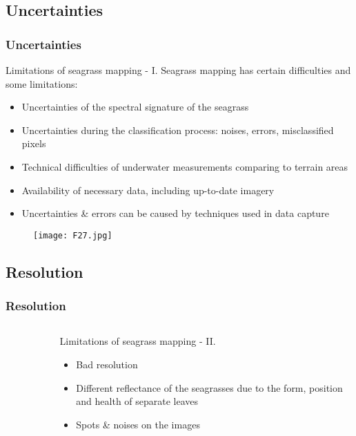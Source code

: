 \documentclass[pdflatex,compress]{beamer}
\begin{document}
\subsection{Uncertainties}
\begin{frame}\frametitle{Uncertainties}
\scriptsize{Limitations of seagrass mapping - I. Seagrass mapping has certain difficulties and some limitations:
\begin{itemize}
	\item Uncertainties of the spectral signature of the seagrass
	\item Uncertainties during the classification process: noises, errors, misclassified pixels
	\item Technical difficulties of underwater measurements comparing to terrain areas
	\item Availability of necessary data, including up-to-date imagery
	\item Uncertainties \& errors can be caused by techniques used in data capture
\end{itemize}}
\begin{figure}[H]
	\centering
		\texttt{[image: F27.jpg]}
\end{figure}
\end{frame}

\subsection{Resolution}
\begin{frame}\frametitle{Resolution}
\begin{minipage}[0.4\textheight]{\textwidth}
\begin{columns}[T]
\begin{column}{0.4\textwidth}
\begin{figure}[H]
	\centering
			\vspace{1mm}
\end{figure}
\end{column}
\begin{column}{0.6\textwidth}
\vspace{2em} 
\scriptsize{Limitations of seagrass mapping - II.
\begin{itemize}
	\item Bad resolution
	\item Different reflectance of the seagrasses due to the form, position and health of separate leaves
	\item Spots \& noises on the images
\end{itemize}}
\begin{figure}[H]
	\centering
			\hspace{1mm}
\end{figure}
\end{column}
\end{columns}
\end{minipage}
\end{frame}
\end{document}
